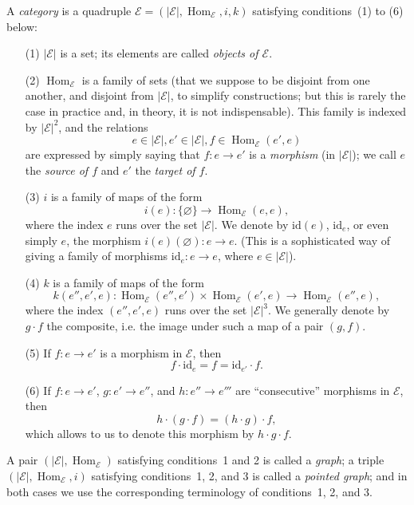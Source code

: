 \documentclass[fleqn]{article}
\newcommand{\oldpage}[1]{\marginpar{\footnotesize$\Big\vert$ \textit{p.~#1}}}
\newcommand{\id}{\mathrm{id}}
\newcommand{\cat}[1]{\mathcal{#1}}
\newcommand{\set}[1]{|#1|}
\DeclareMathOperator{\Hom}{Hom}
\begin{document}
A \emph{category} is a quadruple $\cat{E}=(\set{\cat{E}}, \Hom_\cat{E}, i, k)$ satisfying conditions~(1) to (6) below:

\begin{enumerate}
  \item[(1)] $\set{\cat{E}}$ is a set; its elements are called \emph{objects of $\cat{E}$}.

  \item[(2)] $\Hom_\cat{E}$ is a family of sets (that we suppose to be disjoint from one another, and disjoint from $\set{\cat{E}}$, to simplify constructions; but this is rarely the case in practice and, in theory, it is not indispensable).
    This family is indexed by $\set{\cat{E}}^2$, and the relations
    \[
      e\in\set{\cat{E}},
      e'\in\set{\cat{E}},
      f\in\Hom_\cat{E}(e',e)
    \]
    are expressed by simply saying that $f\colon e\to e'$ is a \emph{morphism} (in $\set{\cat{E}}$);
    we call $e$ the \emph{source of $f$} and $e'$ the \emph{target of $f$}.

  \item[(3)] $i$ is a family of maps of the form
    \[
      i(e)\colon \{\varnothing\}
      \to \Hom_\cat{E}(e,e),
    \]
    where the index $e$ runs over the set $\set{\cat{E}}$.
    We denote by $\id(e)$, $\id_e$, or even simply $e$, the morphism $i(e)(\varnothing)\colon e\to e$.
    \oldpage{220}
    (This is a sophisticated way of giving a family of morphisms $\id_e\colon e\to e$, where $e\in\set{\cat{E}}$).

  \item[(4)] $k$ is a family of maps of the form
    \[
      k(e'',e',e)\colon
      \Hom_\cat{E}(e'',e')\times\Hom_\cat{E}(e',e)
      \to \Hom_\cat{E}(e'',e),
    \]
    where the index $(e'',e',e)$ runs over the set $\set{\cat{E}}^3$.
    We generally denote by $g\cdot f$ the composite, i.e. the image under such a map of a pair $(g,f)$.

  \item[(5)] If $f\colon e\to e'$ is a morphism in $\cat{E}$, then
    \[
      f\cdot\id_e
      = f
      = \id_{e'}\cdot f.
    \]

  \item[(6)] If $f\colon e\to e'$, $g\colon e'\to e''$, and $h\colon e''\to e'''$ are ``consecutive'' morphisms in $\cat{E}$, then
    \[
      h\cdot(g\cdot f)
      = (h\cdot g)\cdot f,
    \]
    which allows to us to denote this morphism by $h\cdot g\cdot f$.
\end{enumerate}

A pair $(\set{\cat{E}},\Hom_\cat{E})$ satisfying conditions~1 and 2 is called a \emph{graph}; a triple $(\set{\cat{E}},\Hom_\cat{E},i)$ satisfying conditions~1, 2, and 3 is called a \emph{pointed graph}; and in both cases we use the corresponding terminology of conditions~1, 2, and 3.
\end{document}
